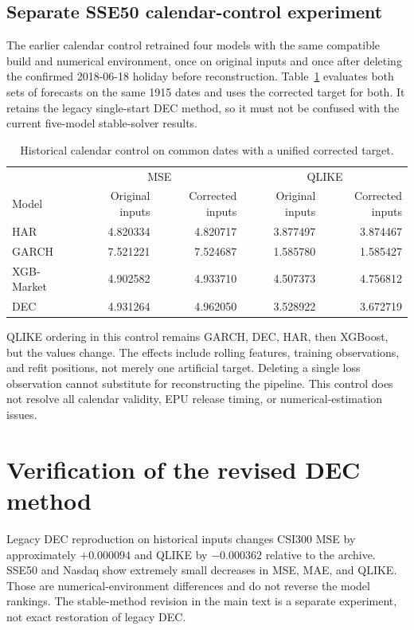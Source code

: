 \subsection{Separate SSE50 calendar-control experiment}
The earlier calendar control retrained four models with the same compatible build and numerical environment, once on original inputs and once after deleting the confirmed 2018-06-18 holiday before reconstruction. Table~\ref{tab:calendar_sensitivity} evaluates both sets of forecasts on the same 1915 dates and uses the corrected target for both. It retains the legacy single-start DEC method, so it must not be confused with the current five-model stable-solver results.

\begin{table}[htbp]\centering\small
\caption{Historical calendar control on common dates with a unified corrected target.}
\label{tab:calendar_sensitivity}
\begin{tabular}{lrrrr}\toprule
& \multicolumn{2}{c}{MSE} & \multicolumn{2}{c}{QLIKE}\\
Model & Original inputs & Corrected inputs & Original inputs & Corrected inputs\\\midrule
HAR & 4.820334 & 4.820717 & 3.877497 & 3.874467\\
GARCH & 7.521221 & 7.524687 & 1.585780 & 1.585427\\
XGB-Market & 4.902582 & 4.933710 & 4.507373 & 4.756812\\
DEC & 4.931264 & 4.962050 & 3.528922 & 3.672719\\\bottomrule
\end{tabular}
\end{table}

QLIKE ordering in this control remains GARCH, DEC, HAR, then XGBoost, but the values change. The effects include rolling features, training observations, and refit positions, not merely one artificial target. Deleting a single loss observation cannot substitute for reconstructing the pipeline. This control does not resolve all calendar validity, EPU release timing, or numerical-estimation issues.

\section{Verification of the revised DEC method}
\label{app:solver}
Legacy DEC reproduction on historical inputs changes CSI300 MSE by approximately $+0.000094$ and QLIKE by $-0.000362$ relative to the archive. SSE50 and Nasdaq show extremely small decreases in MSE, MAE, and QLIKE. Those are numerical-environment differences and do not reverse the model rankings. The stable-method revision in the main text is a separate experiment, not exact restoration of legacy DEC.

